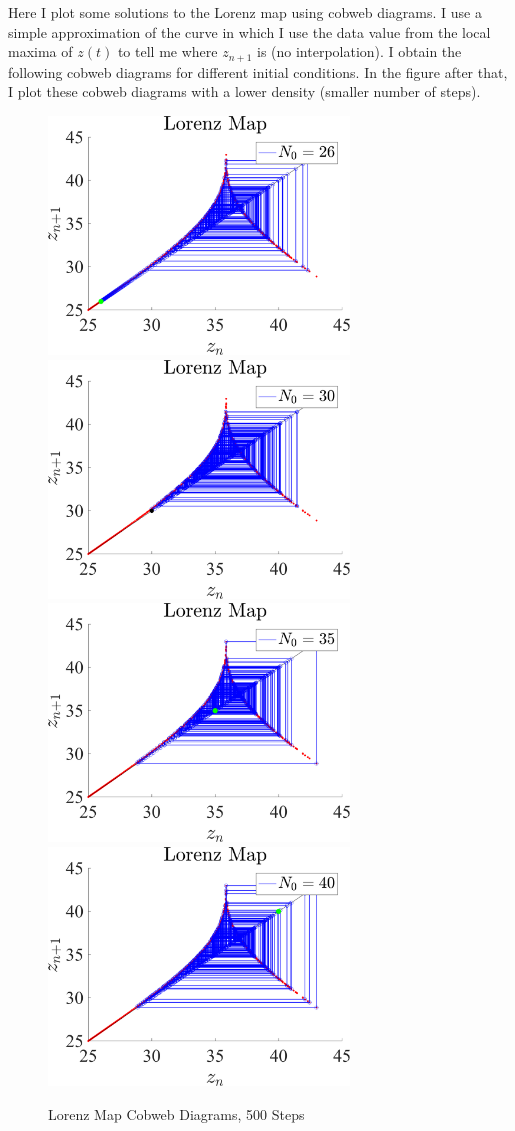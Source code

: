 \documentclass[11pt]{article}
\begin{document}
Here I plot some solutions to the Lorenz map using cobweb diagrams. I use a simple approximation of the curve in which I use the data value from the local maxima of $z(t)$ to tell me where $z_{n+1}$ is (no interpolation). I obtain the following cobweb diagrams for different initial conditions. In the figure after that, I plot these cobweb diagrams with a lower density (smaller number of steps). 
\begin{figure}[h]
\centering
\includegraphics[width=8cm]{Lorenz_map_cobwebs_No26.png}
\includegraphics[width=8cm]{Lorenz_map_cobwebs_No30.png}
\includegraphics[width=8cm]{Lorenz_map_cobwebs_No35.png}
\includegraphics[width=8cm]{Lorenz_map_cobwebs_No40.png}
\caption{Lorenz Map Cobweb Diagrams, 500 Steps}
\end{figure}
\end{document}
